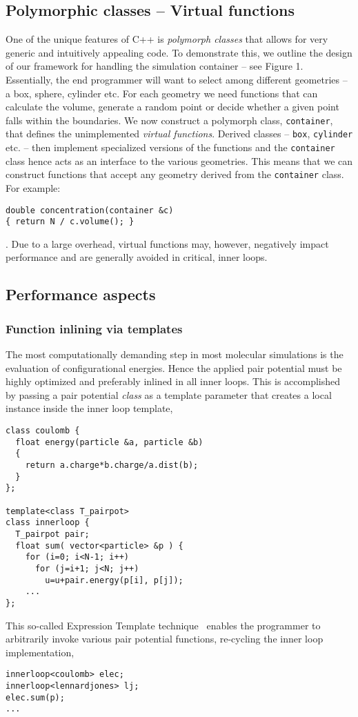 \documentclass[10pt]{bmc_article}
\newenvironment{bmcformat}{\begin{raggedright}\baselineskip20pt\sloppy\setboolean{publ}{false}}{\end{raggedright}\baselineskip20pt\sloppy}
\begin{document}
\begin{bmcformat}
\subsection*{Polymorphic classes -- Virtual functions}
One of the unique features of C++ is \emph{polymorph classes} that allows for very generic and intuitively appealing code.
To demonstrate this, we outline the design of our framework for handling the simulation container -- see Figure 1.
Essentially, the end programmer will want to select among different geometries -- a box, sphere, cylinder etc.
For each geometry we need functions that can calculate the volume, generate a random point or decide whether a given point falls within the boundaries.
We now construct a polymorph class, \verb"container", that defines the unimplemented \emph{virtual functions}.
Derived classes -- \verb"box", \verb"cylinder" etc. -- then implement specialized versions of the functions and the \verb"container" class hence acts as an interface to the various geometries.
This means that we can construct functions that accept any geometry derived from the \verb"container" class.
For example:
\begin{verbatim}
double concentration(container &c)
{ return N / c.volume(); }
\end{verbatim}.
Due to a large overhead, virtual functions may, however, negatively impact performance and are generally avoided in critical, inner loops.

\subsection*{Performance aspects}
\subsubsection*{Function inlining via templates}
The most computationally demanding step in most molecular simulations is the evaluation of configurational energies.
Hence the applied pair potential must be highly optimized and preferably inlined in all inner loops.
This is accomplished by passing a pair potential \emph{class} as a template parameter that creates a local instance inside the inner loop template,
\begin{verbatim}
class coulomb {
  float energy(particle &a, particle &b)
  {
    return a.charge*b.charge/a.dist(b);
  }
};

template<class T_pairpot>
class innerloop {
  T_pairpot pair;
  float sum( vector<particle> &p ) {
    for (i=0; i<N-1; i++)
      for (j=i+1; j<N; j++) 
        u=u+pair.energy(p[i], p[j]);
    ...
};
\end{verbatim}
This so-called Expression Template technique~\cite{veldhuizen:95} enables the programmer to arbitrarily invoke various pair potential functions, re-cycling the inner loop implementation,
\begin{verbatim}
innerloop<coulomb> elec;
innerloop<lennardjones> lj;
elec.sum(p);
...
\end{verbatim}


\end{bmcformat}
\end{document}
